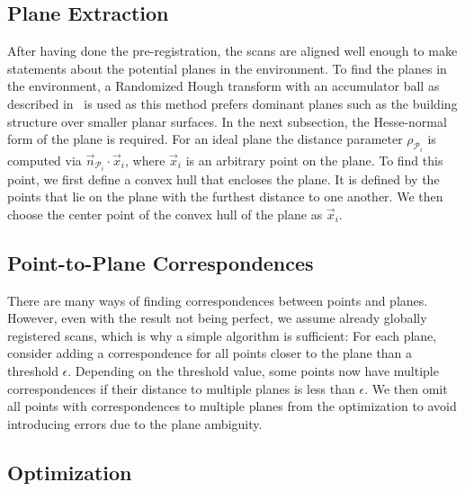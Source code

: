 \subsection{Plane Extraction}

After having done the pre-registration, the scans are aligned well enough to make statements about the potential planes in the environment.
To find the planes in the environment, a Randomized Hough transform with an accumulator ball as described in~\cite{3DRESEARCH2011} is used as this method prefers dominant planes such as the building structure over smaller planar surfaces.
In the next subsection, the Hesse-normal form of the plane is required.
For an ideal plane the distance parameter $\rho_{\mathcal{P}_i}$ is computed via $\vec{n}_{\mathcal{P}_i}\cdot\vec{x}_i$, where $\vec{x}_i$ is an arbitrary point on the plane.
To find this point, we first define a convex hull that encloses the plane.
It is defined by the points that lie on the plane with the furthest distance to one another.
We then choose the center point of the convex hull of the plane as $\vec{x}_i$.

\subsection{Point-to-Plane Correspondences}

There are many ways of finding correspondences between points and planes.
However, even with the result not being perfect, we assume already globally registered scans, which is why a simple algorithm is sufficient:
For each plane, consider adding a correspondence for all points closer to the plane than a threshold $\epsilon$.
Depending on the threshold value, some points now have multiple correspondences if their distance to multiple planes is less than $\epsilon$. We then omit all points with correspondences to multiple planes from the optimization to avoid introducing errors due to the plane ambiguity.

\subsection{Optimization}

